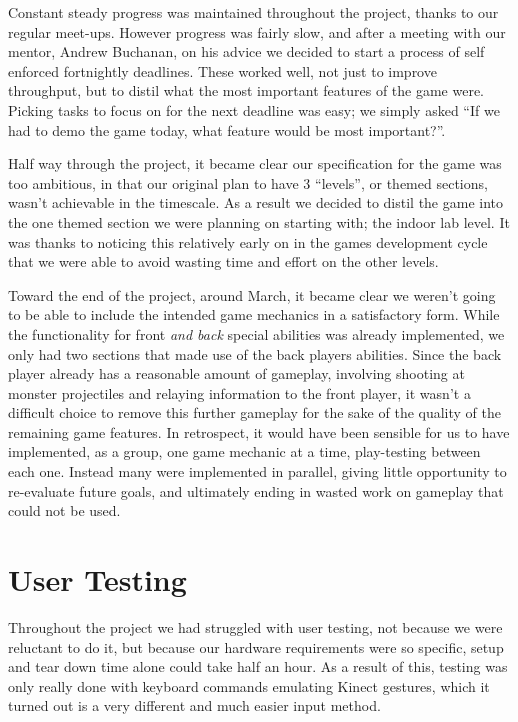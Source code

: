 \documentclass[a4paper,oneside]{memoir}
\begin{document}
		Constant steady progress was maintained throughout the project, thanks to our regular meet-ups. However progress was fairly slow, and after a meeting with our mentor, Andrew Buchanan, on his advice we decided to start a process of self enforced fortnightly deadlines.
		These worked well, not just to improve throughput, but to distil what the most important features of the game were.
		Picking tasks to focus on for the next deadline was easy; we simply asked ``If we had to demo the game today, what feature would be most important?''. 

		Half way through the project, it became clear our specification for the game was too ambitious, in that our original plan to have 3 ``levels'', or themed sections, wasn't achievable in the timescale. 
		As a result we decided to distil the game into the one themed section we were planning on starting with; the indoor lab level. 
		It was thanks to noticing this relatively early on in the games development cycle that we were able to avoid wasting time and effort on the other levels.

		Toward the end of the project, around March, it became clear we weren't going to be able to include the intended game mechanics in a satisfactory form. 
		While the functionality for front \emph{and back} special abilities was already implemented, we only had two sections that made use of the back players abilities. 
		Since the back player already has a reasonable amount of gameplay, involving shooting at monster projectiles and relaying information to the front player, it wasn't a difficult choice to remove this further gameplay for the sake of the quality of the remaining game features.
		In retrospect, it would have been sensible for us to have implemented, as a group, one game mechanic at a time, play-testing between each one. 
		Instead many were implemented in parallel, giving little opportunity to re-evaluate future goals, and ultimately ending in wasted work on gameplay that could not be used.

		\section{User Testing}
			Throughout the project we had struggled with user testing, not because we were reluctant to do it, but because our hardware requirements were so specific, setup and tear down time alone could take half an hour.
			As a result of this, testing was only really done with keyboard commands emulating Kinect gestures, which it turned out is a very different and much easier input method.
\end{document}
